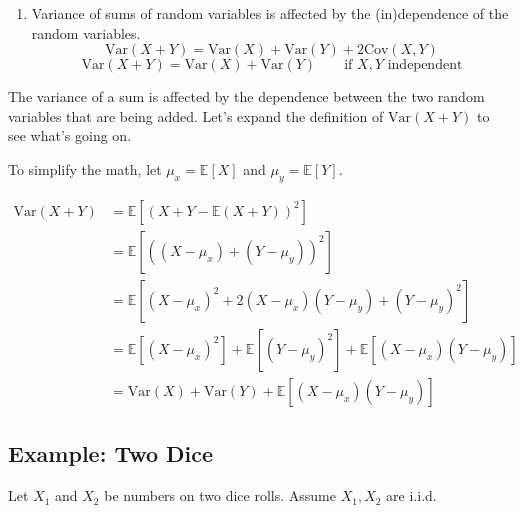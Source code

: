 \documentclass[
  letterpaper,
  DIV=11,
  numbers=noendperiod]{scrreprt}
\providecommand{\tightlist}{%
  \setlength{\itemsep}{0pt}\setlength{\parskip}{0pt}}\usepackage{longtable,booktabs,array}
\begin{document}
\begin{enumerate}
\def\labelenumi{\arabic{enumi}.}
\setcounter{enumi}{1}
\tightlist
\item
  Variance of sums of random variables is affected by the (in)dependence
  of the random variables.
  \[\text{Var}(X + Y) = \text{Var}(X) + \text{Var}(Y) + 2\text{Cov}(X,Y)\]
  \[\text{Var}(X + Y) = \text{Var}(X) + \text{Var}(Y) \qquad \text{if } X, Y \text{ independent}\]
\end{enumerate}

\begin{tcolorbox}[enhanced jigsaw, arc=.35mm, left=2mm, toprule=.15mm, leftrule=.75mm, bottomrule=.15mm, colframe=quarto-callout-tip-color-frame, rightrule=.15mm, colbacktitle=quarto-callout-tip-color!10!white, opacitybacktitle=0.6, coltitle=black, bottomtitle=1mm, colback=white, toptitle=1mm, title=\textcolor{quarto-callout-tip-color}{\faLightbulb}\hspace{0.5em}{Proof}, breakable, opacityback=0, titlerule=0mm]

The variance of a sum is affected by the dependence between the two
random variables that are being added. Let's expand the definition of
\(\text{Var}(X + Y)\) to see what's going on.

To simplify the math, let \(\mu_x = \mathbb{E}[X]\) and
\(\mu_y = \mathbb{E}[Y]\).

\[ \begin{align}
\text{Var}(X + Y) &= \mathbb{E}[(X+Y- \mathbb{E}(X+Y))^2] \\
&= \mathbb{E}[((X - \mu_x) + (Y - \mu_y))^2] \\
&= \mathbb{E}[(X - \mu_x)^2 + 2(X - \mu_x)(Y - \mu_y) + (Y - \mu_y)^2] \\
&= \mathbb{E}[(X - \mu_x)^2] + \mathbb{E}[(Y - \mu_y)^2] + \mathbb{E}[(X - \mu_x)(Y - \mu_y)] \\
&= \text{Var}(X) + \text{Var}(Y) + \mathbb{E}[(X - \mu_x)(Y - \mu_y)] 
\end{align}\]

\end{tcolorbox}

\subsection{Example: Two Dice}\label{example-two-dice}

Let \(X_1\) and \(X_2\) be numbers on two dice rolls. Assume
\(X_1, X_2\) are i.i.d.
\end{document}
